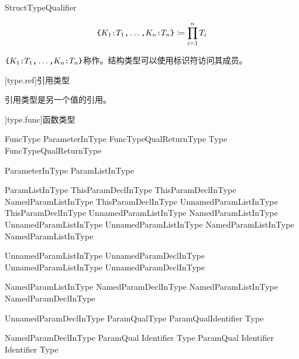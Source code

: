 \begin{bnf}{StructTypeQualifier}
\end{bnf}

$$ \texttt{\{} K_1\texttt{:}T_1\texttt{,} \ldots\texttt{,} K_n\texttt{:}T_n \texttt{\}} \coloneqq \prod^n_{i=1} T_i $$

\pnum
$\texttt{\{}K_1\texttt{:}T_1\texttt{,} \ldots\texttt{,} K_n\texttt{:}T_n\texttt{\}}$称作。结构类型可以使用标识符访问其成员。

[type.ref]{引用类型}

\pnum
引用类型是另一个值的引用。

[type.func]{函数类型}

\begin{bnf}{FuncType}
    ParameterInType FuncTypeQual\bnfs ReturnType \br
    Type FuncTypeQual\bnfs ReturnType
\end{bnf}

\begin{bnf}{ParameterInType}
    \terminal{(} ParamListInType\bnfq \terminal{)}
\end{bnf}

\begin{bnf}{ParamListInType}
    ThisParamDeclInType \br
    ThisParamDeclInType \terminal{,} NamedParamListInType \br
    ThisParamDeclInType \terminal{,} UnnamedParamListInType \br
    ThisParamDeclInType \terminal{,} UnnamedParamListInType \terminal{,} NamedParamListInType \br
    UnnamedParamListInType \br
    UnnamedParamListInType \terminal{,} NamedParamListInType \br
    NamedParamListInType
\end{bnf}

\begin{bnf}{UnnamedParamListInType}
    UnnamedParamDeclInType \br
    UnnamedParamListInType \terminal{,} UnnamedParamDeclInType
\end{bnf}

\begin{bnf}{NamedParamListInType}
    NamedParamDeclInType \br
    NamedParamListInType \terminal{,} NamedParamDeclInType
\end{bnf}

\begin{bnf}{UnnamedParamDeclInType}
    ParamQual\bnfq Type \br
    ParamQual\bnfq Identifier \terminal{:} Type\bnfq
\end{bnf}

\begin{bnf}{NamedParamDeclInType}
    ParamQual\bnfq \terminal{(} Identifier \terminal{)} Type\bnfq
    ParamQual\bnfq \terminal{(} Identifier \terminal{)} Identifier \terminal{:} Type\bnfq
\end{bnf}

